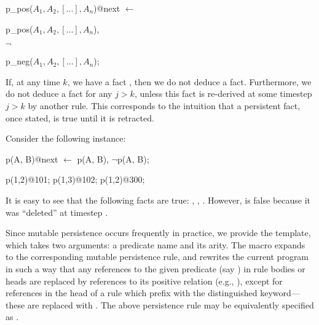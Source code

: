 \begin{dedalus}
p\_pos($A_1,A_2,[...],A_n$)@next $\leftarrow$
\end{dedalus}

\hspace{5mm}
\begin{dedalus}
p\_pos($A_1,A_2,[...],A_n$),
\end{dedalus}

\hspace{5mm}
$\lnot$
\begin{dedalus}
p\_neg($A_1,A_2,[...],A_n$);
\end{dedalus}

\noindent If, at any time $k$, we have a fact
, then we do not deduce a
 fact.  Furthermore, we do not deduce a
 fact for any $j > k$, unless this
 fact is re-derived at some timestep $j > k$ by another rule.
This corresponds to the intuition that a persistent fact, once stated, is true
until it is retracted.

\begin{example}
Consider the following \lang instance:

\begin{Dedalus}
p\pos(A, B)@next \(\leftarrow\) p\pos(A, B), \(\lnot\)p\nega(A, B);

p(1,2)@101;
p(1,3)@102;
p\nega(1,2)@300;
\end{Dedalus}

It is easy to see that the following facts are true: ,
, .  However,  is
false because it was ``deleted'' at timestep .
\end{example}

Since mutable persistence occurs frequently in practice, we provide the
 template, which takes two arguments: a predicate name and
its arity.  The macro expands to the corresponding mutable persistence rule,
and rewrites the current program in such a way that any references to the given
predicate (say ) in rule bodies or heads are replaced by references
to its positive relation (e.g., ), except for references in the
head of a rule which prefix  with the distinguished 
keyword---these are replaced with .  The above
 persistence rule may be equivalently specified as
.

